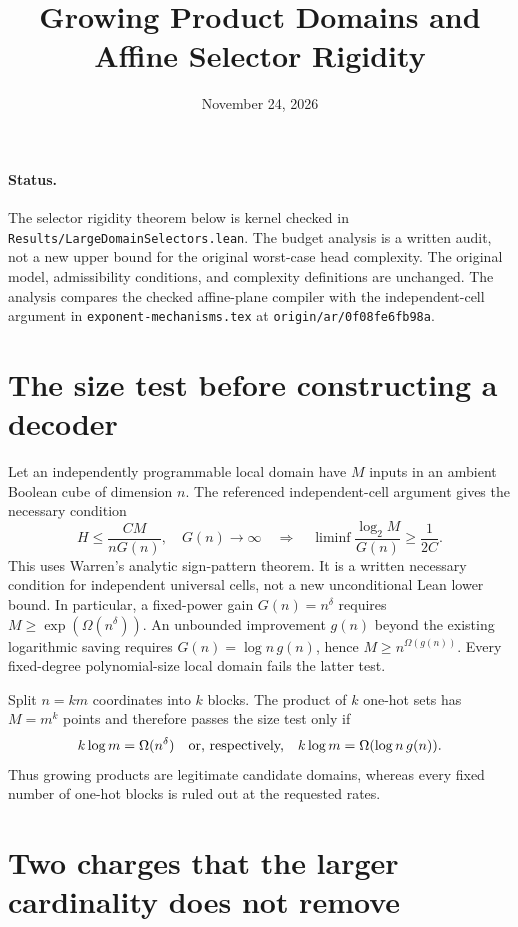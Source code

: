 \documentclass[11pt]{article}
\begin{document}
\title{Growing Product Domains and Affine Selector Rigidity}
\author{}
\date{November 24, 2026}
\maketitle

\paragraph{Status.}
The selector rigidity theorem below is kernel checked in
\texttt{Results/LargeDomainSelectors.lean}. The budget analysis is a written
audit, not a new upper bound for the original worst-case head complexity.
The original model, admissibility conditions, and complexity definitions
are unchanged. The analysis compares the checked affine-plane compiler with
the independent-cell argument in \texttt{exponent-mechanisms.tex} at
\texttt{origin/ar/0f08fe6fb98a}.

\section{The size test before constructing a decoder}

Let an independently programmable local domain have $M$ inputs in an
ambient Boolean cube of dimension $n$. The referenced independent-cell
argument gives the necessary condition
\[
 H\leq \frac{CM}{nG(n)},\quad G(n)\longrightarrow\infty
 \quad\Longrightarrow\quad
 \liminf\frac{\log_2 M}{G(n)}\geq\frac1{2C}.
\]
This uses Warren's analytic sign-pattern theorem. It is a written necessary
condition for independent universal cells, not a new unconditional Lean
lower bound. In particular, a fixed-power gain $G(n)=n^\delta$ requires
$M\geq\exp(\Omega(n^\delta))$. An unbounded improvement $g(n)$ beyond the
existing logarithmic saving requires $G(n)=\log n\,g(n)$, hence
$M\geq n^{\Omega(g(n))}$. Every fixed-degree polynomial-size local domain
fails the latter test.

Split $n=km$ coordinates into $k$ blocks. The product of $k$ one-hot sets
has $M=m^k$ points and therefore passes the size test only if
\[
 k\log m=\Omega(n^\delta)
 \quad\hbox{or, respectively,}\quad
 k\log m=\Omega(\log n\,g(n)).
\]
Thus growing products are legitimate candidate domains, whereas every
fixed number of one-hot blocks is ruled out at the requested rates.

\section{Two charges that the larger cardinality does not remove}
\end{document}
